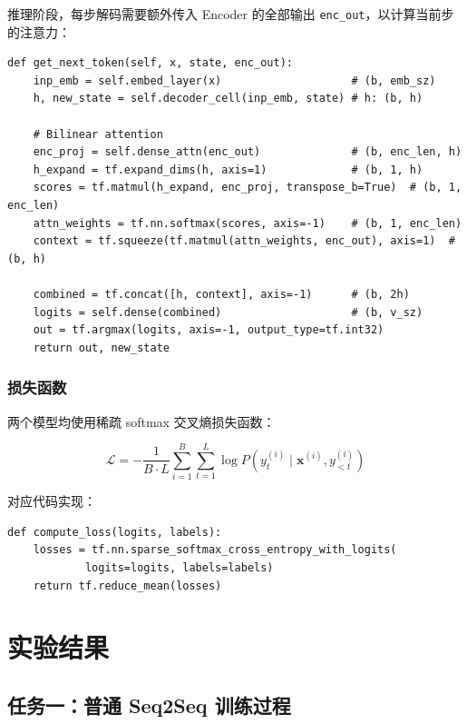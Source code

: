 \documentclass[12pt, a4paper]{article}
\begin{document}
推理阶段，每步解码需要额外传入 Encoder 的全部输出 \texttt{enc\_out}，以计算当前步的注意力：

\begin{lstlisting}[caption={带注意力的单步解码 get\_next\_token}]
def get_next_token(self, x, state, enc_out):
    inp_emb = self.embed_layer(x)                    # (b, emb_sz)
    h, new_state = self.decoder_cell(inp_emb, state) # h: (b, h)

    # Bilinear attention
    enc_proj = self.dense_attn(enc_out)              # (b, enc_len, h)
    h_expand = tf.expand_dims(h, axis=1)             # (b, 1, h)
    scores = tf.matmul(h_expand, enc_proj, transpose_b=True)  # (b, 1, enc_len)
    attn_weights = tf.nn.softmax(scores, axis=-1)    # (b, 1, enc_len)
    context = tf.squeeze(tf.matmul(attn_weights, enc_out), axis=1)  # (b, h)

    combined = tf.concat([h, context], axis=-1)      # (b, 2h)
    logits = self.dense(combined)                    # (b, v_sz)
    out = tf.argmax(logits, axis=-1, output_type=tf.int32)
    return out, new_state
\end{lstlisting}

\subsubsection{损失函数}

两个模型均使用稀疏 softmax 交叉熵损失函数：

\begin{equation}
    \mathcal{L} = -\frac{1}{B \cdot L} \sum_{i=1}^{B} \sum_{t=1}^{L} \log P(y_t^{(i)} \mid \mathbf{x}^{(i)}, y_{<t}^{(i)})
\end{equation}

对应代码实现：

\begin{lstlisting}[caption={损失函数}]
def compute_loss(logits, labels):
    losses = tf.nn.sparse_softmax_cross_entropy_with_logits(
            logits=logits, labels=labels)
    return tf.reduce_mean(losses)
\end{lstlisting}

\section{实验结果}

\subsection{任务一：普通 Seq2Seq 训练过程}
\end{document}
